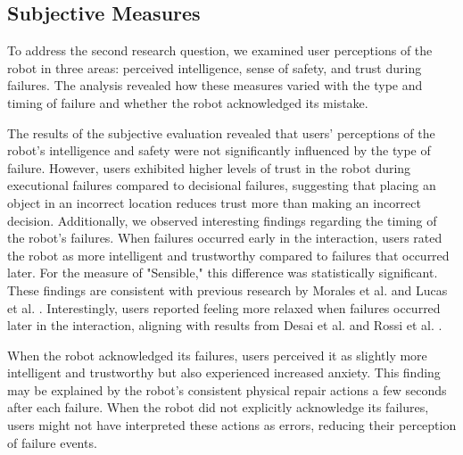 \subsection{Subjective Measures}

To address the second research question, we examined user perceptions of the robot in three areas: perceived intelligence, sense of safety, and trust during failures. The analysis revealed how these measures varied with the type and timing of failure and whether the robot acknowledged its mistake.

The results of the subjective evaluation revealed that users' perceptions of the robot's intelligence and safety were not significantly influenced by the type of failure. However, users exhibited higher levels of trust in the robot during executional failures compared to decisional failures, suggesting that placing an object in an incorrect location reduces trust more than making an incorrect decision. Additionally, we observed interesting findings regarding the timing of the robot's failures. When failures occurred early in the interaction, users rated the robot as more intelligent and trustworthy compared to failures that occurred later. For the measure of "Sensible," this difference was statistically significant. These findings are consistent with previous research by Morales et al. \cite{morales_interaction_2019} and Lucas et al. \cite{lucas_getting_2018}. Interestingly, users reported feeling more relaxed when failures occurred later in the interaction, aligning with results from Desai et al. \cite{desai_impact_2013} and Rossi et al. \cite{rossi_how_2017}.

When the robot acknowledged its failures, users perceived it as slightly more intelligent and trustworthy but also experienced increased anxiety. This finding may be explained by the robot’s consistent physical repair actions a few seconds after each failure. When the robot did not explicitly acknowledge its failures, users might not have interpreted these actions as errors, reducing their perception of failure events.

